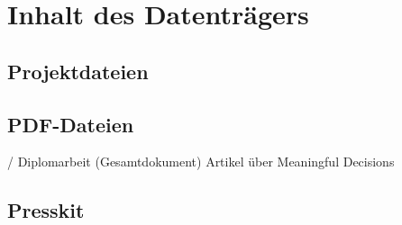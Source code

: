 \chapter{Inhalt des Datenträgers}

\section{Projektdateien}

\section{PDF-Dateien} %
\begin{FileList}{/}
	 Diplomarbeit (Gesamtdokument)
	 Artikel über Meaningful Decisions
\end{FileList}
 

\section{Presskit} %
